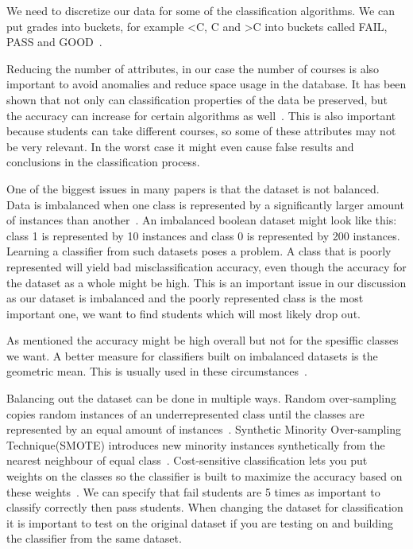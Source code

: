 \bigskip\noindent
We need to discretize our data for some of the classification algorithms.
We can put grades into buckets, for example \textless C, C and \textgreater C into buckets called FAIL, PASS and GOOD~\cite{12}.

\bigskip\noindent
Reducing the number of attributes, in our case the number of courses is also important to avoid anomalies and reduce space usage in the database.
It has been shown that not only can classification properties of the data be preserved, but the accuracy can increase for certain algorithms as well~\cite{9}.
This is also important because students can take different courses, so some of these attributes may not be very relevant. 
In the worst case it might even cause false results and conclusions in the classification process.

\bigskip\noindent
One of the biggest issues in many papers is that the dataset is not balanced. 
Data is imbalanced when one class is represented by a significantly larger amount of instances than another~\cite{10}. 
An imbalanced boolean dataset might look like this: class 1 is represented by 10 instances and class 0 is represented by 200 instances. 
Learning a classifier from such datasets poses a problem. 
A class that is poorly represented will yield bad misclassification accuracy, 
even though the accuracy for the dataset as a whole might be high. 
This is an important issue in our discussion as our dataset is imbalanced and the poorly represented class is the most important one, 
we want to find students which will most likely drop out.

\bigskip\noindent
As mentioned the accuracy might be high overall but not for the spesiffic classes we want.
A better measure for classifiers built on imbalanced datasets is the geometric mean. 
This is usually used in these circumstances~\cite{12}. 

\bigskip\noindent
Balancing out the dataset can be done in multiple ways. 
Random over-sampling copies random instances of an underrepresented class until the classes are represented by an equal amount of instances~\cite{12}. 
Synthetic Minority Over-sampling Technique(SMOTE) introduces new minority instances synthetically from the nearest neighbour of equal class~\cite{9}. 
Cost-sensitive classification lets you put weights on the classes so the classifier is built to maximize the accuracy based on these weights~\cite{9}. 
We can specify that fail students are 5 times as important to classify correctly then pass students. 
When changing the dataset for classification it is important to test on the original dataset if you are testing on and building the classifier from the same dataset.

